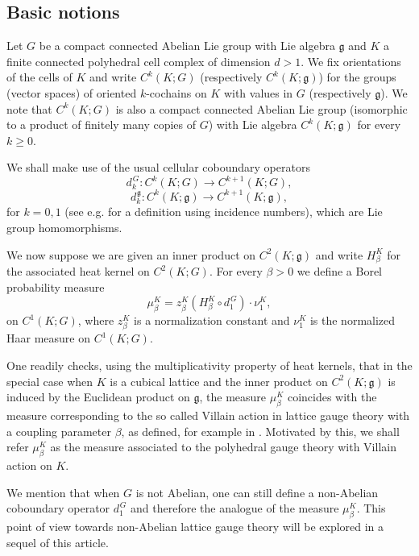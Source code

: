 \documentclass[11pt,reqno]{amsart}
\numberwithin{equation}{section}
\theoremstyle{remark}
\theoremstyle{rmdefinition}
\begin{document}
\subsection{Basic notions}
Let $G$ be a compact connected Abelian Lie group with Lie algebra $\mathfrak g$ and $K$ a finite connected polyhedral cell complex of dimension $d>1$. We fix orientations of the cells of $K$ and write $C^k(K;G)$ (respectively $C^k(K;\mathfrak g)$) for the groups (vector spaces) of oriented $k$-cochains on $K$ with values in $G$ (respectively $\mathfrak g$). We note that $C^k(K;G)$ is also a compact connected Abelian Lie group (isomorphic to a product of finitely many copies of $G$) with Lie algebra $C^k(K;\mathfrak g)$ for every $k \geq 0$.

We shall make use of the usual cellular coboundary operators
$$ d_k^{\hspace{1pt}G}: C^k(K;G)\to  C^{k+1}(K;G),$$
$$ d_k^{\hspace{1pt}\mathfrak g}: C^k(K;\mathfrak g)\to  C^{k+1}(K;\mathfrak g),$$
for $k=0,1$ (see e.g. \cite[Chapter IX]{Mas} for a definition using incidence numbers), which are Lie group homomorphisms.

We now suppose we are given an inner product on $C^2(K;\mathfrak g)$ and write $H^K_{\beta}$ for the associated heat kernel on $C^2(K;G)$. For every $\beta >0$ we define a Borel probability measure
\begin{equation}\label{genvildefmea}
\mu^K_{\beta}=z^K_\beta (H^K_{\beta} \circ d_1^{\hspace{1pt}G}) \cdot \nu^K_1,
\end{equation}
on $C^1(K;G)$, where $z^K_\beta$ is a normalization constant and $\nu^K_1$ is the normalized Haar measure on $C^1(K;G)$.

One readily checks, using the multiplicativity property of heat kernels, that in the special case when $K$ is a cubical lattice and the inner product on $C^2(K;\mathfrak g)$ is induced by the Euclidean product on $\mathfrak g$,  the measure $\mu^K_{\beta}$ coincides with the measure corresponding to the so called Villain action in lattice gauge theory with a coupling parameter $\beta$, as defined, for example in \cite[p. 6]{Sei}. Motivated by this, we shall refer  $\mu^K_{\beta}$ as the measure associated to the polyhedral gauge theory with Villain action on $K$.

We mention that when $G$ is not Abelian, one can still define a non-Abelian coboundary operator $d_1^{\hspace{1pt}G}$ and therefore the analogue of the measure $\mu^K_{\beta}$. This point of view towards non-Abelian lattice gauge theory will be explored in a sequel of this article.
\end{document}
